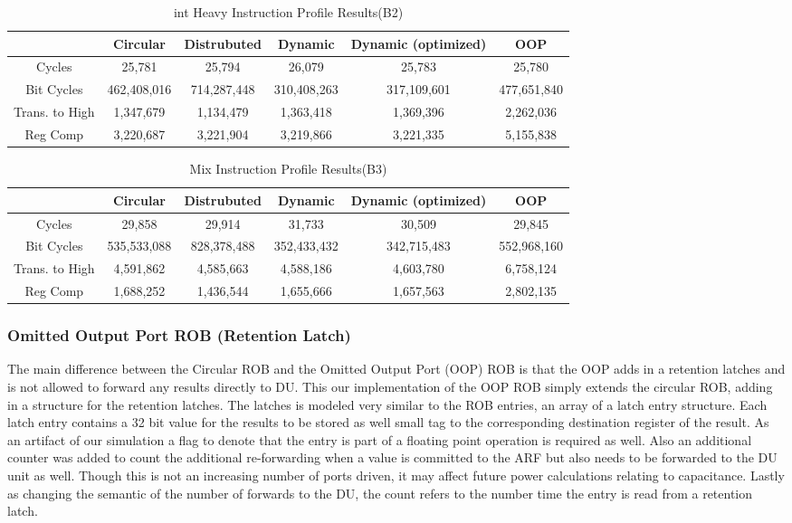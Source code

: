 \begin{table*}[!tb]
\centering
\caption{int Heavy Instruction Profile Results(B2)}
\begin{tabular}{|c|c|c|c|c|c|} \hline
    & Circular  & Distrubuted & Dynamic & Dynamic (optimized) & OOP\\ \hline
Cycles&25,781&	25,794&	26,079	&25,783	&25,780\\ \hline
Bit Cycles&462,408,016	&714,287,448	&310,408,263	&317,109,601	&477,651,840\\ \hline
Trans. to High&1,347,679&	1,134,479	&1,363,418&	1,369,396	&2,262,036\\ \hline
Reg Comp&3,220,687	&3,221,904	&3,219,866	&3,221,335&	5,155,838\\ \hline
\end{tabular}
\end{table*}

\begin{table*}[!tb]
\centering
\caption{Mix Instruction Profile Results(B3)}
\begin{tabular}{|c|c|c|c|c|c|} \hline
    & Circular  & Distrubuted & Dynamic & Dynamic (optimized) & OOP\\ \hline
Cycles&29,858	&29,914	&31,733	&30,509	&29,845\\ \hline

Bit Cycles&535,533,088&	828,378,488&	352,433,432	&342,715,483	&552,968,160\\ \hline

Trans. to High&4,591,862	&4,585,663	&4,588,186&	4,603,780&	6,758,124\\ \hline

Reg Comp&1,688,252&	1,436,544	&1,655,666	&1,657,563	&2,802,135\\ \hline
\end{tabular}
\end{table*}


\subsubsection{Omitted Output Port ROB (Retention Latch)}
The main difference between the Circular ROB and the Omitted Output Port (OOP) ROB is that the OOP adds in a retention latches and is not allowed to forward any results directly to DU.  This our implementation of the OOP ROB simply extends the circular ROB, adding in a structure for the retention latches.  The latches is modeled very similar to the ROB entries, an array
of a latch entry structure.  Each latch entry contains a 32 bit value for the results to be stored as well small tag to the corresponding destination register of the result.  As an artifact of our simulation a flag to denote that the entry is part of a floating point operation is required as well.  Also an additional counter was added to count the additional re-forwarding when a value is committed to the ARF but also needs to be forwarded to the DU unit as well.  Though this is not an increasing number of ports driven, it may affect future power calculations relating to capacitance.  Lastly as changing the semantic of the number of forwards to the DU, the count refers to the number time the entry is read from a retention latch.

